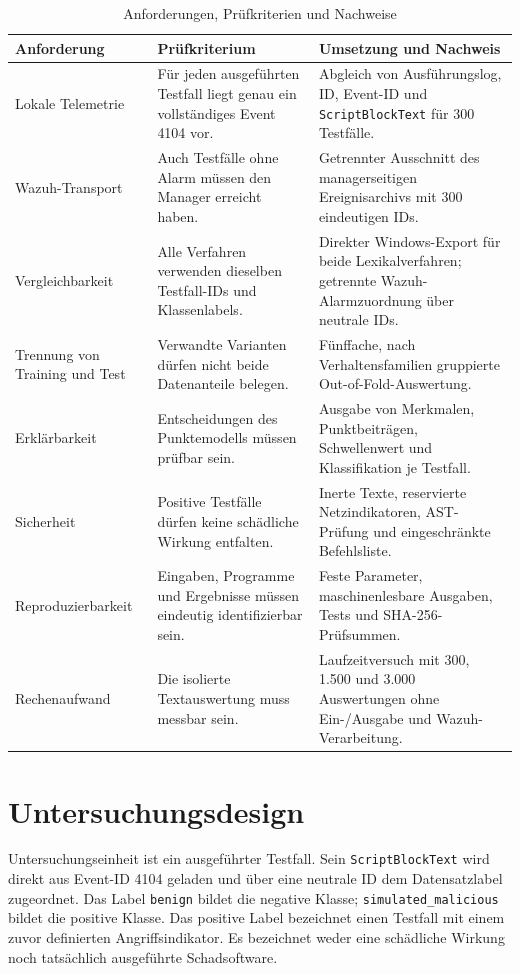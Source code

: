 \documentclass[12pt,a4paper,oneside,parskip=half]{scrreprt}
\begin{document}
\begin{table}[H]
\centering
\caption[Anforderungen, Prüfkriterien und Nachweise]{Anforderungen, Prüfkriterien und Nachweise}
\label{tab:requirements}
\small
\begin{tabularx}{\textwidth}{|L{3.2cm}|L{3.9cm}|Y|}
\hline
\textbf{Anforderung} & \textbf{Prüfkriterium} & \textbf{Umsetzung und Nachweis}\\
\hline
Lokale Telemetrie & Für jeden ausgeführten Testfall liegt genau ein vollständiges Event 4104 vor. & Abgleich von Ausführungslog, ID, Event-ID und \texttt{ScriptBlockText} für 300 Testfälle.\\
\hline
Wazuh-Transport & Auch Testfälle ohne Alarm müssen den Manager erreicht haben. & Getrennter Ausschnitt des managerseitigen Ereignisarchivs mit 300 eindeutigen IDs.\\
\hline
Vergleichbarkeit & Alle Verfahren verwenden dieselben Testfall-IDs und Klassenlabels. & Direkter Windows-Export für beide Lexikalverfahren; getrennte Wazuh-Alarmzuordnung über neutrale IDs.\\
\hline
Trennung von Training und Test & Verwandte Varianten dürfen nicht beide Datenanteile belegen. & Fünffache, nach Verhaltensfamilien gruppierte Out-of-Fold-Auswertung.\\
\hline
Erklärbarkeit & Entscheidungen des Punktemodells müssen prüfbar sein. & Ausgabe von Merkmalen, Punktbeiträgen, Schwellenwert und Klassifikation je Testfall.\\
\hline
Sicherheit & Positive Testfälle dürfen keine schädliche Wirkung entfalten. & Inerte Texte, reservierte Netzindikatoren, AST-Prüfung und eingeschränkte Befehlsliste.\\
\hline
Reproduzierbarkeit & Eingaben, Programme und Ergebnisse müssen eindeutig identifizierbar sein. & Feste Parameter, maschinenlesbare Ausgaben, Tests und SHA-256-Prüfsummen.\\
\hline
Rechenaufwand & Die isolierte Textauswertung muss messbar sein. & Laufzeitversuch mit 300, 1.500 und 3.000 Auswertungen ohne Ein-/Ausgabe und Wazuh-Verarbeitung.\\
\hline
\end{tabularx}
\end{table}
\section{Untersuchungsdesign}
Untersuchungseinheit ist ein ausgeführter Testfall. Sein \texttt{ScriptBlockText} wird direkt aus Event-ID 4104 geladen und über eine neutrale ID dem Datensatzlabel zugeordnet. Das Label \texttt{benign} bildet die negative Klasse; \texttt{simulated\_malicious} bildet die positive Klasse. Das positive Label bezeichnet einen Testfall mit einem zuvor definierten Angriffsindikator. Es bezeichnet weder eine schädliche Wirkung noch tatsächlich ausgeführte Schadsoftware.
\end{document}
